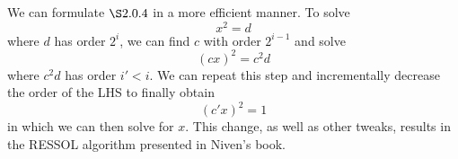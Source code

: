 \documentclass{article}
\begin{document}
\subsubsection{}
We can formulate $\S2.0.4$ in a more efficient manner. To solve
\begin{equation}
    x^{2} = d
\end{equation}
where $d$ has order $2^{i}$, we can find $c$ with order $2^{i-1}$ and solve
\begin{equation}
    (cx)^{2} = c^{2}d
\end{equation}
where $c^{2}d$ has order $i' < i$. We can repeat this step and incrementally decrease the order of the LHS to finally obtain
\begin{equation}
    (c'x)^{2} = 1
\end{equation}
in which we can then solve for $x$. This change, as well as other tweaks, results in the RESSOL algorithm presented in Niven's book.
\end{document}
